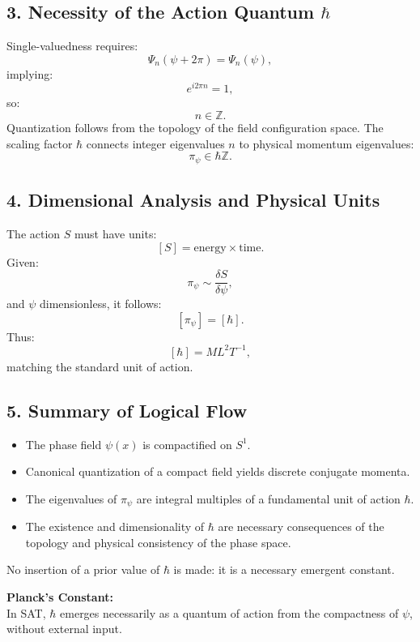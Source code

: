 \documentclass[12pt]{article}
\begin{document}
\subsection*{3. Necessity of the Action Quantum \(\hbar\)}
Single-valuedness requires:
\[
\Psi_n(\psi + 2\pi) = \Psi_n(\psi),
\]
implying:
\[
e^{i 2\pi n} = 1,
\]
so:
\[
n \in \mathbb{Z}.
\]
Quantization follows from the topology of the field configuration space. The scaling factor \(\hbar\) connects integer eigenvalues \(n\) to physical momentum eigenvalues:
\[
\pi_\psi \in \hbar \mathbb{Z}.
\]

\subsection*{4. Dimensional Analysis and Physical Units}
The action \(S\) must have units:
\[
[S] = \text{energy} \times \text{time}.
\]
Given:
\[
\pi_\psi \sim \frac{\delta S}{\delta \psi},
\]
and \(\psi\) dimensionless, it follows:
\[
[\pi_\psi] = [\hbar].
\]
Thus:
\[
[\hbar] = M L^2 T^{-1},
\]
matching the standard unit of action.

\subsection*{5. Summary of Logical Flow}
\begin{itemize}
    \item The phase field \(\psi(x)\) is compactified on \(S^1\).
    \item Canonical quantization of a compact field yields discrete conjugate momenta.
    \item The eigenvalues of \(\pi_\psi\) are integral multiples of a fundamental unit of action \(\hbar\).
    \item The existence and dimensionality of \(\hbar\) are necessary consequences of the topology and physical consistency of the phase space.
\end{itemize}

No insertion of a prior value of \(\hbar\) is made: it is a necessary emergent constant.


\begin{mdframed}[linewidth=1pt]
\textbf{Planck's Constant:} \\
In SAT, \( \hbar \) emerges necessarily as a quantum of action from the compactness of \( \psi \), without external input.
\end{mdframed}
\end{document}
